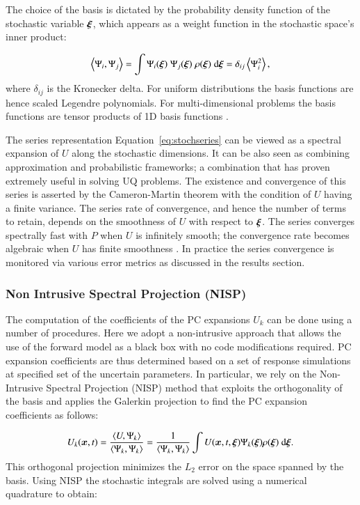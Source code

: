 The choice of the basis is dictated by the probability density
function of the stochastic variable $\xxi$, which appears as a weight
function in the stochastic space's inner product:

\begin{equation}
 \left<\Psi_i,\Psi_j\right> = \int \Psi_i(\xxi) \;\Psi_j(\xxi) \; \rho(\xxi) \; \mbox{d}\xxi=\delta_{ij}\ave{\Psi_i^2},
\label{eq:inner}
\end{equation}
where $\delta_{ij}$ is the Kronecker delta.
For uniform
distributions the basis functions are hence scaled Legendre polynomials.
For multi-dimensional problems the basis functions are
tensor products of 1D basis functions .

The series representation Equation~\eqref{eq:stochseries} can be viewed as a spectral expansion
of $U$ along the stochastic dimensions. It can be also seen as
combining approximation and probabilistic frameworks; a combination
that has proven extremely useful in solving UQ problems. The existence and convergence of this series is asserted by the Cameron-Martin theorem \citep{Cameron:1947} with the condition of $U$ having a finite variance.
The series rate of convergence, and hence the number of terms to retain, depends on the smoothness of
$U$ with respect to $\xxi$. The series converges spectrally fast with $P$
when $U$ is infinitely smooth; the convergence rate becomes algebraic
when $U$ has finite smoothness \citep{Canuto:2006}. In practice the series convergence is monitored 
via various error metrics as discussed in the results section.

\subsubsection{Non Intrusive Spectral Projection (NISP)}
The computation of the coefficients of the PC expansions $U_k$
can be done using a number of procedures. Here we adopt a non-intrusive
approach that allows the use of the forward model \geoclaw as a black box
with no code modifications required. PC expansion coefficients are thus determined
based on a set of response \geoclaw simulations at specified set of the uncertain parameters. 
In particular, we rely on the Non-Intrusive Spectral Projection (NISP) method that exploits the orthogonality of the basis and applies the Galerkin projection to find the PC expansion coefficients as follows:

\begin{equation}
 U_k(\bm{x},t) = \frac{\left< U, \Psi_k \right>}{\left< \Psi_k, \Psi_k \right>} = 
 \frac{1}{\left< \Psi_k, \Psi_k \right>} 
 \int U(\bm{x},t,\xxi) \Psi_k(\xxi) \rho(\xxi) \mbox{ d}\xxi.
\end{equation}
This orthogonal projection minimizes the $L_2$ error on the space spanned by the basis.
Using NISP the stochastic integrals are solved using a numerical quadrature to obtain:

